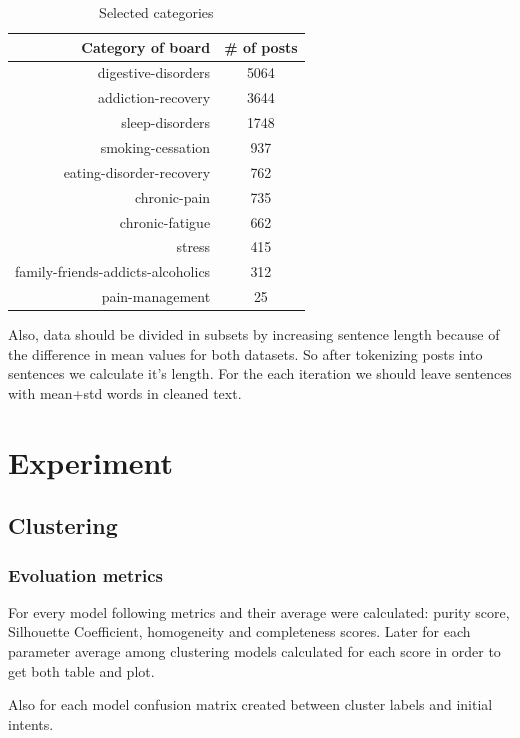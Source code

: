 \documentclass[11pt]{article}
\begin{document}
\begin{table}[htb]
\centering
\begin{tabular}{ |r|c| }
\hline
Category of board &  \# of posts \\ \hline
digestive-disorders & 5064 \\ \hline
addiction-recovery & 3644 \\ \hline
sleep-disorders & 1748 \\ \hline
smoking-cessation & 937 \\ \hline
eating-disorder-recovery & 762 \\ \hline
chronic-pain & 735 \\ \hline
chronic-fatigue & 662 \\ \hline
stress & 415 \\ \hline
family-friends-addicts-alcoholics & 312 \\ \hline
pain-management & 25 \\ \hline
\end{tabular}
\caption{\label{cat_freq}Selected categories}
\end{table}
\FloatBarrier

Also, data should be divided in subsets by increasing sentence length because of the difference in mean values for both datasets. So after tokenizing posts into sentences we calculate it's length. For the each iteration we should leave sentences with mean+std words in cleaned text.


\section{Experiment}

\subsection{Clustering}

\subsubsection{Evoluation metrics}

For every model following metrics and their average were calculated: purity score, Silhouette Coefficient, homogeneity and completeness scores. Later for each parameter average among clustering models calculated for each score in order to get both table and plot.

Also for each model confusion matrix created between cluster labels and initial intents.
\end{document}
